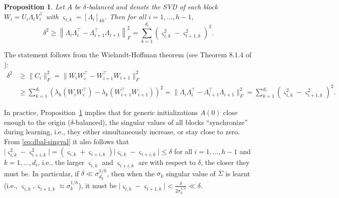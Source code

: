 \documentclass{article}
\makeatletter
\renewenvironment{proof}[1][\proofname]{
  \par\pushQED{\qed}\normalfont
  \topsep6\p@\@plus6\p@\relax
  \trivlist\item[\hskip\labelsep\bfseries#1\@addpunct{.}]
  \ignorespaces
}{
  \popQED\endtrivlist\@endpefalse
}
\newtheorem{proposition}{Proposition}
\newcommand{\1}{\mathds{1}}
\makeatother
\begin{document}
\begin{proposition}\label{prop:delta-balance}
	Let $ A $ be $ \delta $-balanced and denote the SVD of each block $ W_i = U_i \Lambda_i V_i^\top $ with $ \varsigma_{i,k} = [\Lambda_i]_{kk} $. Then for all $ i = 1,...,h-1 $, 
	\begin{equation}
		\delta^2 \geq \left\| \Lambda_i \Lambda_i^\top - \Lambda_{i+1}^\top \Lambda_{i+1} \right \|_F^2 = \sum_{k=1}^{d_i} (\varsigma_{i,k}^2 - \varsigma_{i+1,k}^2)^2. 
        \label{eq:dbal-singval}
	\end{equation}
\end{proposition}

\begin{proof}
	The statement follows from the Wielandt-Hoffman theorem (see Theorem 8.1.4 of \cite{golub2013matrix}):
	\begin{align*}
		\delta^2 & \geq  \| C_{i} \|_F^2 = \| W_i W_i^\top - W_{i+1}^\top W_{i+1} \|_F^2 \\&\geq \sum_{k=1}^{d_i} (\lambda_k( W_i W_i^\top ) - \lambda_k( W_{i+1}^\top W_{i+1} ))^2  = \| \Lambda_i \Lambda_i^\top - \Lambda_{i+1}^\top \Lambda_{i+1} \|_F^2 = \sum_{k=1}^{d_i} (\varsigma_{i,k}^2 - \varsigma_{i+1,k}^2)^2.
	\end{align*}
\end{proof}
In practice, Proposition~\ref{prop:delta-balance} implies that for generic initializations $ A(0) $ close enough to the origin ($ \delta $-balanced), the singular values of all blocks ``synchronize'' during learning, i.e., they either simultaneously increase, or stay close to zero. 
From \eqref{eq:dbal-singval} it also follows that $ \lvert \varsigma_{i,k}^2 - \varsigma_{i+i,k}^2 \rvert = ( \varsigma_{i,k} + \varsigma_{i+i,k} ) \lvert \varsigma_{i,k} - \varsigma_{i+i,k} \rvert \leq \delta $ for all $ i = 1,...,h-1$ and $ k = 1,..., d_i $, i.e., the larger $ \varsigma_{i,k} $ and $ \varsigma_{i+i,k} $ are with respect to $ \delta$, the closer they must be.
In particular, if $ \delta\ll \sigma_{d_y}^{1/h} $, then when the $ \sigma_k$ singular value of $ \Sigma $ is learnt (i.e., $ \varsigma_{i,k}, \varsigma_{i+1,k} \approx \sigma_k^{1/h} $), it must be $ \lvert \varsigma_{i,k} - \varsigma_{i+1,k} \rvert < \frac{\delta}{2 \sigma_k^{1/h} } \ll \delta $.
\end{document}
